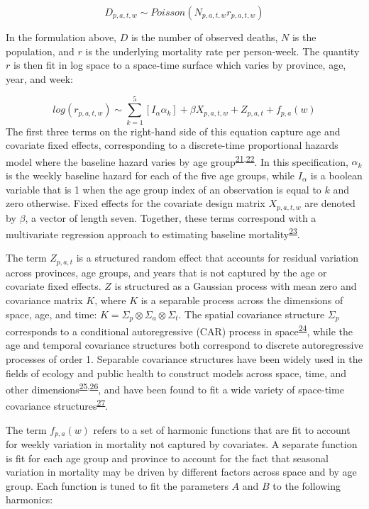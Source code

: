 \documentclass[
]{article}
\begin{document}
\[D_{p,a,t,w} \sim Poisson(N_{p,a,t,w}r_{p,a,t,w})\]

In the formulation above, \(D\) is the number of observed deaths, \(N\) is the population, and \(r\) is the underlying mortality rate per person-week. The quantity \(r\) is then fit in log space to a space-time surface which varies by province, age, year, and week:

\[log(r_{p,a,t,w}) \sim \sum_{k=1}^{5}[I_{\alpha}\alpha_{k}] + \beta X_{p,a,t,w} + Z_{p,a,t} + f_{p,a}(w)\]
The first three terms on the right-hand side of this equation capture age and covariate fixed effects, corresponding to a discrete-time proportional hazards model where the baseline hazard varies by age group\textsuperscript{\protect\hyperlink{ref-Cox1972}{21},\protect\hyperlink{ref-Burstein2019}{22}}⁠. In this specification, \(\alpha_k\) is the weekly baseline hazard for each of the five age groups, while \(I_\alpha\) is a boolean variable that is 1 when the age group index of an observation is equal to \(k\) and zero otherwise. Fixed effects for the covariate design matrix \(X_{p,a,t,w}\) are denoted by \(\beta\), a vector of length seven. Together, these terms correspond with a multivariate regression approach to estimating baseline mortality\textsuperscript{\protect\hyperlink{ref-Ederer1961}{23}}⁠.

The term \(Z_{p,a,t}\) is a structured random effect that accounts for residual variation across provinces, age groups, and years that is not captured by the age or covariate fixed effects. \(Z\) is structured as a Gaussian process with mean zero and covariance matrix \(K\), where \(K\) is a separable process across the dimensions of space, age, and time: \(K = \Sigma_p \otimes \Sigma_a \otimes \Sigma_t\). The spatial covariance structure \(\Sigma_p\) corresponds to a conditional autoregressive (CAR) process in space\textsuperscript{\protect\hyperlink{ref-Riebler2016}{24}}, while the age and temporal covariance structures both correspond to discrete autoregressive processes of order 1. Separable covariance structures have been widely used in the fields of ecology and public health to construct models across space, time, and other dimensions\textsuperscript{\protect\hyperlink{ref-Thorson2017}{25},\protect\hyperlink{ref-Wakefield2019}{26}}⁠, and have been found to fit a wide variety of space-time covariance structures\textsuperscript{\protect\hyperlink{ref-Huang2007}{27}}.

The term \(f_{p,a}(w)\) refers to a set of harmonic functions that are fit to account for weekly variation in mortality not captured by covariates. A separate function is fit for each age group and province to account for the fact that seasonal variation in mortality may be driven by different factors across space and by age group. Each function is tuned to fit the parameters \(A\) and \(B\) to the following harmonics:
\end{document}
